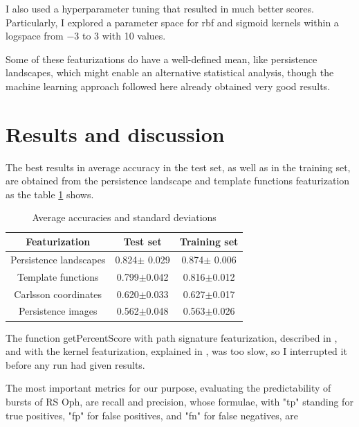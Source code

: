 \documentclass{article}
\begin{document}
I also used a hyperparameter tuning that resulted in much better scores. Particularly, I explored a parameter space for rbf and sigmoid kernels within a logspace from $-3$ to $3$ with 10 values.

Some of these featurizations do have a well-defined mean, like persistence landscapes, which might enable an alternative statistical analysis, though the machine learning approach followed here already obtained very good results.

\section{Results and discussion}

The best results in average accuracy in the test set, as well as in the training set, are obtained from the persistence landscape and template functions featurization  as the table \ref{accuracies_standarddeviations} shows. 
\begin{table}[h!]
\caption{Average accuracies and standard deviations}                 %
\label{accuracies_standarddeviations}    %
\centering                        %
\begin{tabular}{c|c|c}
Featurization	&Test set &Training set 	\\
\hline\hline

Persistence landscapes	&0.824$\pm$ 0.029 &0.874$\pm$ 0.006 	 \\
Template functions	&0.799$\pm$0.042	&0.816$\pm$0.012	 \\
Carlsson coordinates	&0.620$\pm$0.033	&0.627$\pm$0.017	 \\
Persistence images	&0.562$\pm$0.048	&0.563$\pm$0.026	 \\


\end{tabular}
\end{table}

The function getPercentScore with path signature featurization, described in \cite{chevyrev}, and with the kernel featurization, explained in \cite{reininghaus}, was too slow, so I interrupted it before any run had given results. 

The most important metrics for our purpose, evaluating the predictability of bursts of RS Oph, are recall and precision, whose formulae, with "tp" standing for true positives, "fp" for false positives, and "fn" for false negatives, are
\end{document}
